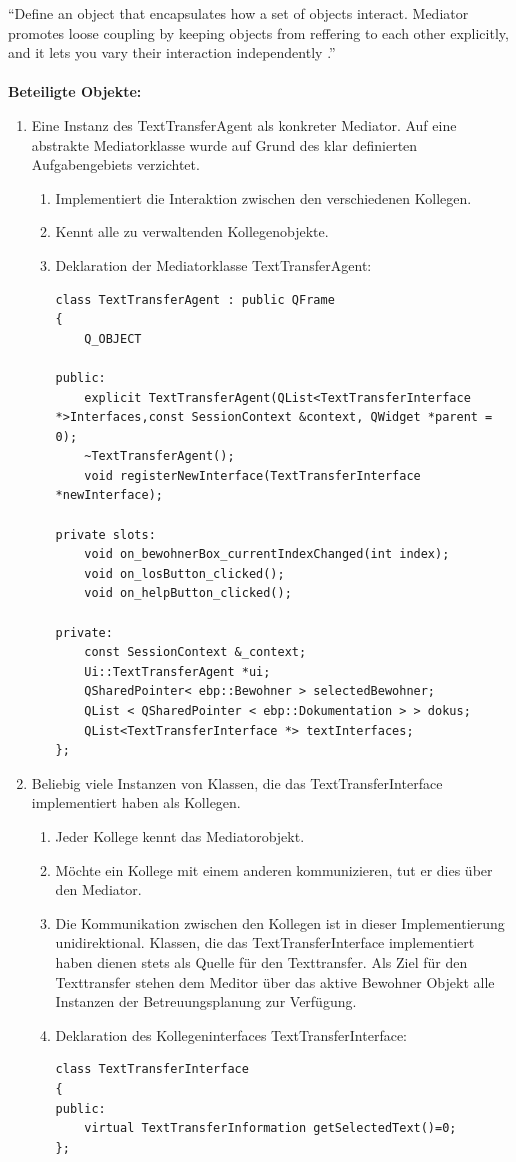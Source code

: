 ``Define an object that encapsulates how a set of objects interact. Mediator promotes loose coupling by keeping objects from reffering to each other explicitly, 
and it lets you vary their interaction independently \cite[S. 273]{Entwurfsmuster}.''\\
\\
\textbf{Beteiligte Objekte\cite[S. 277]{Entwurfsmuster}:}
\begin{enumerate}
	\item Eine Instanz des TextTransferAgent als konkreter Mediator. Auf eine abstrakte Mediatorklasse wurde auf Grund des klar definierten Aufgabengebiets verzichtet.
	\begin{enumerate}
		\item Implementiert die Interaktion zwischen den verschiedenen Kollegen.
		\item Kennt alle zu verwaltenden Kollegenobjekte.
		\item Deklaration der Mediatorklasse TextTransferAgent:
		\begin{lstlisting}
class TextTransferAgent : public QFrame
{
    Q_OBJECT

public:
    explicit TextTransferAgent(QList<TextTransferInterface *>Interfaces,const SessionContext &context, QWidget *parent = 0);
    ~TextTransferAgent();
    void registerNewInterface(TextTransferInterface *newInterface);

private slots:
    void on_bewohnerBox_currentIndexChanged(int index);
    void on_losButton_clicked();
    void on_helpButton_clicked();

private:
    const SessionContext &_context;
    Ui::TextTransferAgent *ui;
    QSharedPointer< ebp::Bewohner > selectedBewohner;
    QList < QSharedPointer < ebp::Dokumentation > > dokus;
    QList<TextTransferInterface *> textInterfaces;
};
		\end{lstlisting}
	\end{enumerate}
	\item Beliebig viele Instanzen von Klassen, die das TextTransferInterface implementiert haben als Kollegen.
	\begin{enumerate}
		\item Jeder Kollege kennt das Mediatorobjekt.
		\item Möchte ein Kollege mit einem anderen kommunizieren, tut er dies über den Mediator.
		\item Die Kommunikation zwischen den Kollegen ist in dieser Implementierung unidirektional. Klassen, die das TextTransferInterface implementiert haben dienen stets 
			als Quelle für den Texttransfer. Als Ziel für den Texttransfer stehen dem Meditor über das aktive Bewohner Objekt alle Instanzen der Betreuungsplanung zur Verfügung.
		\item Deklaration des Kollegeninterfaces TextTransferInterface:
		\begin{lstlisting}
class TextTransferInterface
{
public:
    virtual TextTransferInformation getSelectedText()=0;
};
		\end{lstlisting}
	\end{enumerate}
\end{enumerate}
